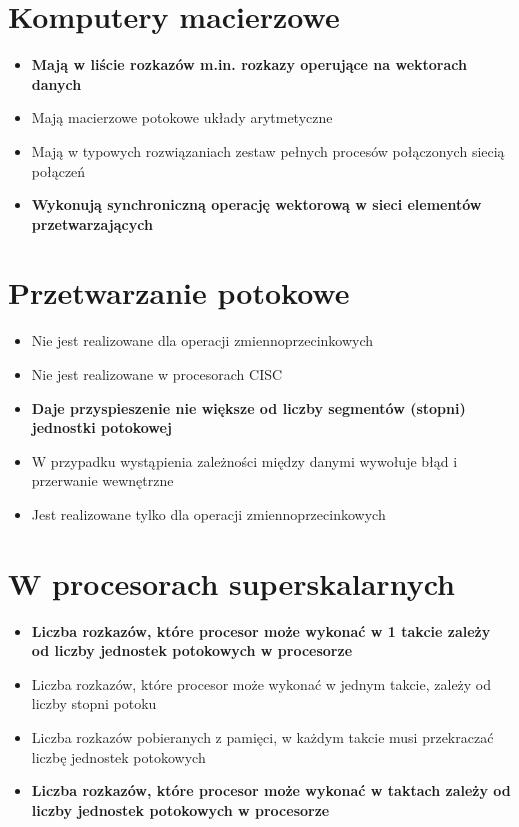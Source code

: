 \documentclass[a4paper,twoside]{article}
\begin{document}
\section{Komputery macierzowe}
	\begin{itemize}
    \item \textbf{Mają w liście rozkazów m.in. rozkazy operujące na wektorach danych}
    \item Mają macierzowe potokowe układy arytmetyczne
    \item Mają w typowych rozwiązaniach zestaw pełnych procesów połączonych siecią połączeń
    \item \textbf{Wykonują synchroniczną operację wektorową w sieci elementów przetwarzających}
    \end{itemize}
    
\section{Przetwarzanie potokowe}
	\begin{itemize}
    \item Nie jest realizowane dla operacji zmiennoprzecinkowych
    \item Nie jest realizowane w procesorach CISC
    \item \textbf{Daje przyspieszenie nie większe od liczby segmentów (stopni) jednostki potokowej}
    \item W przypadku wystąpienia zależności między danymi wywołuje błąd i przerwanie wewnętrzne
    \item Jest realizowane tylko dla operacji zmiennoprzecinkowych
    \end{itemize}

\section{W procesorach superskalarnych}
	\begin{itemize}
    \item \textbf{Liczba rozkazów, które procesor może wykonać w 1 takcie zależy od liczby jednostek potokowych w procesorze}
    \item Liczba rozkazów, które procesor może wykonać w jednym takcie, zależy od liczby stopni potoku
    \item Liczba rozkazów pobieranych z pamięci, w każdym takcie musi przekraczać liczbę jednostek potokowych
    \item \textbf{Liczba rozkazów, które procesor może wykonać w taktach zależy od liczby jednostek potokowych w procesorze}
    \end{itemize}
\end{document}
